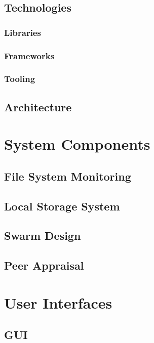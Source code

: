 \documentclass[a4paper, 11pt, twocolumn, twoside]{report}
\begin{document}
\section{Technologies}

\subsection{Libraries}

\subsection{Frameworks}

\subsection{Tooling}

\section{Architecture}

\chapter{System Components}

\section{File System Monitoring}

\section{Local Storage System}

\section{Swarm Design}

\section{Peer Appraisal}

\chapter{User Interfaces}

\section{GUI}
\end{document}
